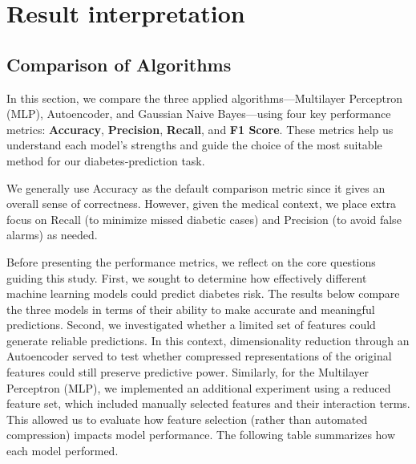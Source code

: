 \section{Result interpretation}

\subsection{Comparison of Algorithms}

In this section, we compare the three applied algorithms—Multilayer Perceptron (MLP), Autoencoder, and Gaussian Naive Bayes—using four key performance metrics: \textbf{Accuracy}, \textbf{Precision}, \textbf{Recall}, and \textbf{F1 Score}. These metrics help us understand each model’s strengths and guide the choice of the most suitable method for our diabetes‐prediction task.

We generally use Accuracy as the default comparison metric since it gives an overall sense of correctness. However, given the medical context, we place extra focus on Recall (to minimize missed diabetic cases) and Precision (to avoid false alarms) as needed.

Before presenting the performance metrics, we reflect on the core questions guiding this study. First, we sought to determine how effectively different machine learning models could predict diabetes risk. The results below compare the three models in terms of their ability to make accurate and meaningful predictions. Second, we investigated whether a limited set of features could generate reliable predictions. In this context, dimensionality reduction through an Autoencoder served to test whether compressed representations of the original features could still preserve predictive power. Similarly, for the Multilayer Perceptron (MLP), we implemented an additional experiment using a reduced feature set, which included manually selected features and their interaction terms. This allowed us to evaluate how feature selection (rather than automated compression) impacts model performance. The following table summarizes how each model performed.
\begin{table}[H]
\centering
{}
\caption{Performance comparison of MLP, Autoencoder, and Gaussian Naive Bayes}
\label{table:comparison}
\end{table}

